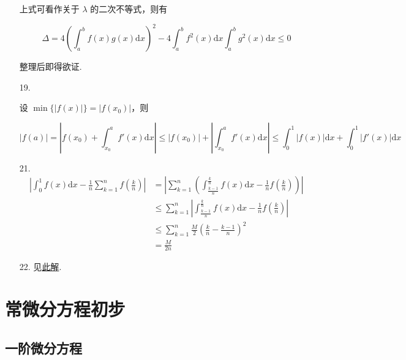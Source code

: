 \documentclass[oneside]{ctexbook} %
\begin{document}
\begin{enumerate}
    上式可看作关于 $\lambda$ 的二次不等式，则有
    
    $$
    \Delta = 4 \left( \int_a^b f(x)g(x) \mathrm dx \right)^2 - 4 \int_a^b f^2(x) \mathrm dx \int_a^b g^2(x) \mathrm dx \leqslant 0
    $$
    
    整理后即得欲证.
    \item[19.]
    
    设 $\min\{ |f(x)| \} = |f(x_0)|$，则
    
    $$
    |f(a)| = \left| f(x_0) + \int_{x_0}^a f'(x) \mathrm dx \right| \leqslant |f(x_0)| + \left| \int_{x_0}^a f'(x) \mathrm dx \right| \leqslant \int_0^1 |f(x)| \mathrm dx + \int_0^1 |f'(x)| \mathrm dx
    $$
    \item[21.]
    $$
    \begin{aligned}
        \left| \int_0^1 f(x) \mathrm dx - \frac 1 n \sum_{k=1}^n f\left( \frac k n \right) \right| &= \left| \sum_{k=1}^n \left( \int_{\frac {k-1} n}^{\frac k n} f(x) \mathrm dx - \frac 1 n f\left( \frac k n \right) \right) \right| \\
        &\leqslant \sum_{k=1}^n \left| \int_{\frac {k-1} n}^{\frac k n} f(x) \mathrm dx - \frac 1 n f\left( \frac k n \right) \right| \\
        &\leqslant \sum_{k=1}^n \frac M 2 (\frac k n - \frac {k-1} n)^2 \\
        &= \frac M {2n}
    \end{aligned}
    $$
    \item[22.]
    见\href{https://www.zhihu.com/question/611041671/answer/3109739799}{此解}.
\end{enumerate}

\newpage
\chapter{常微分方程初步}

\section{一阶微分方程}
\end{document}
